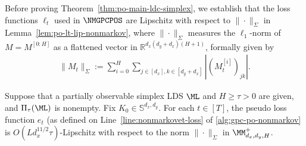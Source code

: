 Before proving Theorem~\ref{thm:po-main-ldc-simplex}, we establish that the loss functions $\ell_t$ used in $\NMGPCPOS$ are Lipschitz with respect to $\|\cdot\|_{\Sigma}$ in Lemma~\ref{lem:po-lt-lip-nonmarkov}, where $\|\cdot\|_{\Sigma}$ measures the $\ell_1$-norm of $M=M^{[0:H]}$ as a flattened vector in $\mathbb{R}^{d_x(d_y+d_x)(H+1)}$, formally given by
\begin{align*}
\|M_t\|_{\Sigma}:=\sum_{i=0}^{H}\sum_{j\in[d_x],k\in[d_y+d_x]}|(M_t^{[i]})_{jk}|.
\end{align*}

\begin{lemma} [Lipschitzness of $e_t$]
\label{lem:po-lt-lip-nonmarkov}
Suppose that a partially observable simplex LDS $\ML$ and $H\ge \tau>0$ are given, and $\Pi_{\tau}(\ML)$ is nonempty. Fix $K_0\in\mathbb{S}^{d_x,d_y}$. For each $t\in[T]$, the pseudo loss function $e_t$ (as defined on Line~\ref{line:nonmarkovet-loss} of \cref{alg:gpc-po-nonmarkov} is $O(Ld_x^{11/2}\tau)$-Lipschitz with respect to the norm $\|\cdot\|_{\Sigma}$ in $\MM_{d_x,d_y,H}^{+}$.  %
\end{lemma}

